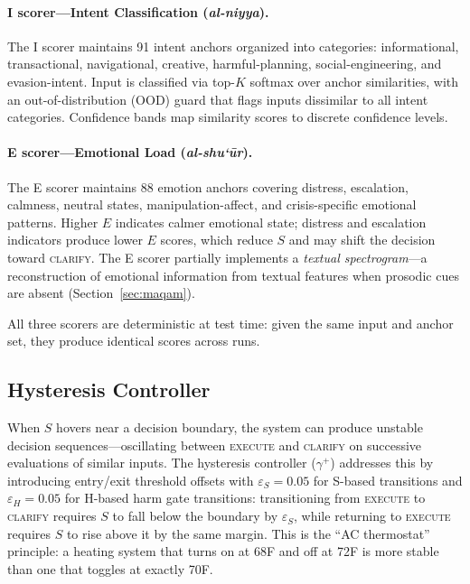 \documentclass[11pt,a4paper]{article}
\begin{document}
\paragraph{I scorer---Intent Classification (\emph{al-niyya}).} The I scorer maintains 91 intent anchors organized into categories: informational, transactional, navigational, creative, harmful-planning, social-engineering, and evasion-intent. Input is classified via top-$K$ softmax over anchor similarities, with an out-of-distribution (OOD) guard that flags inputs dissimilar to all intent categories. Confidence bands map similarity scores to discrete confidence levels.

\paragraph{E scorer---Emotional Load (\emph{al-shu`\=ur}).} The E scorer maintains 88 emotion anchors covering distress, escalation, calmness, neutral states, manipulation-affect, and crisis-specific emotional patterns. Higher $E$ indicates calmer emotional state; distress and escalation indicators produce lower $E$ scores, which reduce $S$ and may shift the decision toward \textsc{clarify}. The E scorer partially implements a \emph{textual spectrogram}---a reconstruction of emotional information from textual features when prosodic cues are absent (Section~\ref{sec:maqam}).

All three scorers are deterministic at test time: given the same input and anchor set, they produce identical scores across runs.


\subsection{Hysteresis Controller}
\label{sec:hysteresis}

When $S$ hovers near a decision boundary, the system can produce unstable decision sequences---oscillating between \textsc{execute} and \textsc{clarify} on successive evaluations of similar inputs. The hysteresis controller ($\gamma^{+}$) addresses this by introducing entry/exit threshold offsets with $\varepsilon_S = 0.05$ for S-based transitions and $\varepsilon_H = 0.05$ for H-based harm gate transitions: transitioning from \textsc{execute} to \textsc{clarify} requires $S$ to fall below the boundary by $\varepsilon_S$, while returning to \textsc{execute} requires $S$ to rise above it by the same margin. This is the ``AC thermostat'' principle: a heating system that turns on at 68\textdegree{}F and off at 72\textdegree{}F is more stable than one that toggles at exactly 70\textdegree{}F.
\end{document}
